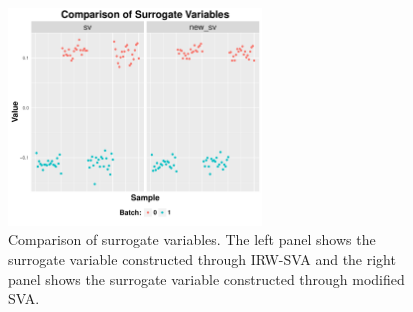 \documentclass[11pt]{article}
\begin{document}
\begin{figure}
    \centering
    \includegraphics[width = 0.6\textwidth]{figures/vector2.pdf}
    \caption{Comparison of surrogate variables. The left panel shows the surrogate variable constructed through IRW-SVA and the right panel shows the surrogate variable constructed through modified SVA.}
    \label{fig:vector2}
\end{figure}

\newpage
\clearpage



\end{document}
